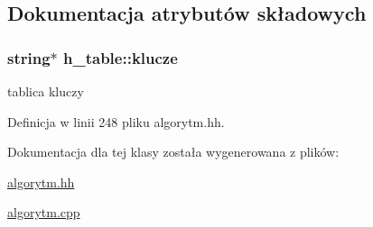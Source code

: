 \subsection{\-Dokumentacja atrybutów składowych}
\hypertarget{classh__table_af7ef9b7c0043f4320e5b8fd9ce3678d5}{
\subsubsection[{klucze}]{\setlength{\rightskip}{0pt plus 5cm}string$\ast$ {\bf h\-\_\-table\-::klucze}}}\label{classh__table_af7ef9b7c0043f4320e5b8fd9ce3678d5}


tablica kluczy 



\-Definicja w linii 248 pliku algorytm.\-hh.



\-Dokumentacja dla tej klasy została wygenerowana z plików\-:\begin{DoxyCompactItemize}
\item 
\hyperlink{algorytm_8hh}{algorytm.\-hh}\item 
\hyperlink{algorytm_8cpp}{algorytm.\-cpp}\end{DoxyCompactItemize}
